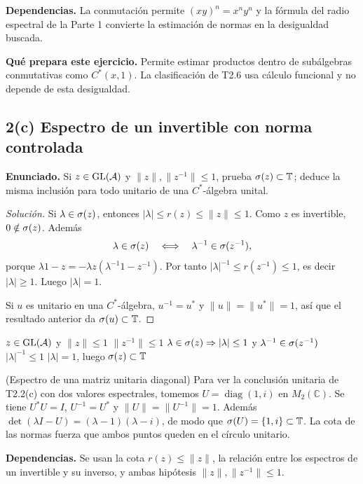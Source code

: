 \noindent\textbf{Dependencias.} La conmutación permite $(xy)^n=x^ny^n$ y la fórmula del radio espectral de la Parte 1 convierte la estimación de normas en la desigualdad buscada.

\noindent\textbf{Qué prepara este ejercicio.} Permite estimar productos dentro de subálgebras conmutativas como $C^*(x,1)$. La clasificación de T2.6 usa cálculo funcional y no depende de esta desigualdad.

\subsection*{2(c) Espectro de un invertible con norma controlada}

\noindent\textbf{Enunciado.} Si $z\in\operatorname{GL}(\mathcal A)$ y $\|z\|,\|z^{-1}\|\le1$, prueba $\sigma(z)\subset\mathbb T$; deduce la misma inclusión para todo unitario de una $C^*$-álgebra unital.

\begin{proof}[Solución]
Si $\lambda\in\sigma(z)$, entonces $|\lambda|\le r(z)\le\|z\|\le1$. Como $z$ es invertible,
$0\notin\sigma(z)$. Además
\[
 \lambda\in\sigma(z)\quad\Longleftrightarrow\quad
 \lambda^{-1}\in\sigma(z^{-1}),
\]
porque
$\lambda1-z=-\lambda z(\lambda^{-1}1-z^{-1})$. Por tanto
$|\lambda|^{-1}\le r(z^{-1})\le1$, es decir $|\lambda|\ge1$. Luego $|\lambda|=1$.

Si $u$ es unitario en una $C^*$-álgebra, $u^{-1}=u^*$ y
$\|u\|=\|u^*\|=1$, así que el resultado anterior da
$\sigma(u)\subset\mathbb T$.
\end{proof}

\proofdiagrambranch
{$z\in\operatorname{GL}(\mathcal A)$ y $\|z\|\le1$}
{$\|z^{-1}\|\le1$}
{$\lambda\in\sigma(z)\Rightarrow |\lambda|\le1$ y $\lambda^{-1}\in\sigma(z^{-1})$}
{$|\lambda|^{-1}\le1$}
{$|\lambda|=1$, luego $\sigma(z)\subset\mathbb T$}

\begin{cthejemplo}{(Espectro de una matriz unitaria diagonal)}
Para ver la conclusión unitaria de T2.2(c) con dos valores espectrales, tomemos
$U=\operatorname{diag}(1,i)$ en $M_2(\mathbb C)$.
Se tiene $U^*U=I$, $U^{-1}=U^*$ y $\|U\|=\|U^{-1}\|=1$.
Además $\det(\lambda I-U)=(\lambda-1)(\lambda-i)$, de modo que
$\sigma(U)=\{1,i\}\subset\mathbb T$.
La cota de las normas fuerza que ambos puntos queden en el círculo unitario.
\end{cthejemplo}

\noindent\textbf{Dependencias.} Se usan la cota $r(z)\le\|z\|$, la relación entre los espectros de un invertible y su inverso, y ambas hipótesis $\|z\|,\|z^{-1}\|\le1$.

